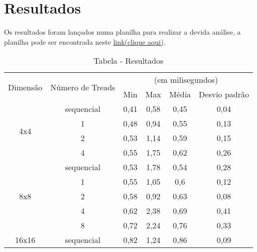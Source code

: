 \newpage
\onecolumn
\section{Resultados}
Os resultados foram lançados numa planilha para realizar a devida análise, a planilha pode ser encontrada neste \href{https://docs.google.com/a/ufrn.edu.br/spreadsheets/d/1tey8rUazIv3H-rDvTVuX3HWysaB38WmbdmQCpsBp2zY/edit?usp=sharing}{link(clique aqui)}.
\begin{table}[!h]
	\centering
	\caption{Tabela - Resultados}
	\label{Tabela Resultados}
	\begin{tabular}{|c|c|cccc|}
		\hline
		\multirow{2}{*}{Dimensão} & \multirow{2}{*}{Número de Treads} & \multicolumn{4}{c}{(em milisegundos)} \\
		&                                   & Min  & Max  & Média  & Desvio padrão  \\ \hline\hline
		\multirow{4}{*}{4x4}      & sequencial   &  0,41    &  0,58    &   0,45     &      0,04          \\
		& 1                                 &    0,48  &   0,94   &   0,55     &  0,13              \\
		& 2                                 &   0,53   & 1,14     & 0,59       &    0,15           \\
		& 4                                 &   0,55   &   1,75   &   0,62     &         0,26       \\ \hline
		\multirow{5}{*}{8x8}      & sequencial&  0,53    & 1,78     &   0,54     &       0,28         \\
											& 1                                 &  0,55    & 1,05     & 0,6       &  0,12              \\
											& 2                                 &  0,58    &  0,92    &   0,63     &        0,08        \\
											& 4                                 &   0,62   &    2,38  &    0,69    &       0,41         \\
											& 8                                 &    0,72  &  2,24    &   0,76     &   0,33             \\ \hline
		\multirow{6}{*}{16x16}      & sequencial    &  0,82    &   1,24   &   0,86     &     0,09           \\

\end{tabular}
\end{table}
